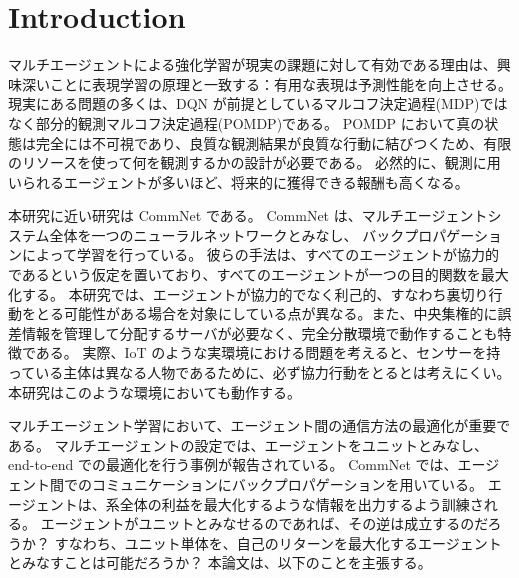 \section{Introduction}

マルチエージェントによる強化学習が現実の課題に対して有効である理由は、興味深いことに表現学習の原理と一致する：有用な表現は予測性能を向上させる。
現実にある問題の多くは、DQN が前提としているマルコフ決定過程(MDP)ではなく部分的観測マルコフ決定過程(POMDP)である\citep[p.258]{sutton1998reinforcement}。
POMDP において真の状態は完全には不可視であり、良質な観測結果が良質な行動に結びつくため、有限のリソースを使って何を観測するかの設計が必要である。
必然的に、観測に用いられるエージェントが多いほど、将来的に獲得できる報酬も高くなる。

本研究に近い研究は CommNet \citep{sukhbaatar2016learning} である。
CommNet は、マルチエージェントシステム全体を一つのニューラルネットワークとみなし、
バックプロパゲーションによって学習を行っている。
彼らの手法は、すべてのエージェントが協力的であるという仮定を置いており、すべてのエージェントが一つの目的関数を最大化する。
本研究では、エージェントが協力的でなく利己的、すなわち裏切り行動をとる可能性がある場合を対象にしている点が異なる。また、中央集権的に誤差情報を管理して分配するサーバが必要なく、完全分散環境で動作することも特徴である。
実際、IoT のような実環境における問題を考えると、センサーを持っている主体は異なる人物であるために、必ず協力行動をとるとは考えにくい。
本研究はこのような環境においても動作する。

マルチエージェント学習において、エージェント間の通信方法の最適化が重要である。
マルチエージェントの設定では、エージェントをユニットとみなし、end-to-end での最適化を行う事例が報告されている。
CommNet \citep{sukhbaatar2016learning} では、エージェント間でのコミュニケーションにバックプロパゲーションを用いている。
エージェントは、系全体の利益を最大化するような情報を出力するよう訓練される。
エージェントがユニットとみなせるのであれば、その逆は成立するのだろうか？
すなわち、ユニット単体を、自己のリターンを最大化するエージェントとみなすことは可能だろうか？
本論文は、以下のことを主張する。


